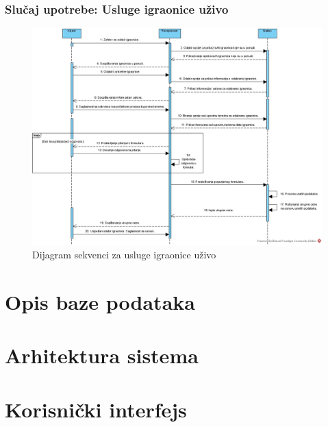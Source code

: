 \documentclass[a4paper]{article}
\begin{document}
\subsubsection{Slučaj upotrebe: Usluge igraonice uživo}

\begin{figure}[!ht]
\begin{center}
\includegraphics[scale=0.4]{sections/images/dijagram_sekvenci_usluge_igraonice_uzivo.jpg}
\end{center}
\caption{Dijagram sekvenci za usluge igraonice uživo}
\label{fig:kontekst}
\end{figure}

\newpage
\newpage
\newpage
\section{Opis baze podataka}


\newpage
\section{Arhitektura sistema}


\newpage
\section{Korisnički interfejs}

\end{document}
